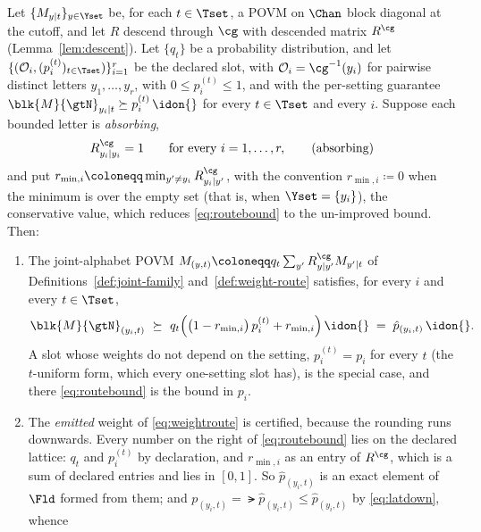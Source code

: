 \begin{proposition}\label{prop:route}
Let $\{M_{y|t}\}_{y\in\Yset}$ be, for each $t\in\Tset$, a POVM on $\Chan$ block
diagonal at the cutoff, and let $R$ descend through $\cg$ with descended matrix
$R^{\cg}$ (Lemma~\ref{lem:descent}). Let $\{q_t\}$ be a probability
distribution, and let $\{(\mathcal{O}_i,(p^{(t)}_i)_{t\in\Tset})\}_{i=1}^{r}$
be the declared slot, with $\mathcal{O}_i=\cg^{-1}(y_i)$ for pairwise distinct
letters $y_1,\dots,y_r$, with $0\le p^{(t)}_i\le1$, and with the per-setting
guarantee $\blk{M}{\gtN}_{y_i|t}\succeq p^{(t)}_i\,\idon{}$ for every
$t\in\Tset$ and every $i$. Suppose each bounded letter is \emph{absorbing},
\begin{equation}\label{eq:absorbing}
  R^{\cg}_{y_i|y_i}=1
  \qquad\text{for every }i=1,\dots,r,
  \tag{absorbing}
\end{equation}
and put $r_{\min,i}\coloneqq\min_{y'\ne y_i}R^{\cg}_{y_i|y'}$, with the
convention $r_{\min,i}\coloneqq0$ when the minimum is over the empty set (that
is, when $\Yset=\{y_i\}$), the conservative value, which reduces
\eqref{eq:routebound} to the un-improved bound. Then:
\begin{enumerate}[label=(\roman*),leftmargin=2.4em]
\item The joint-alphabet POVM
  $M_{(y,t)}\coloneqq q_t\sum_{y'}R^{\cg}_{y|y'}M_{y'|t}$ of
  Definitions~\ref{def:joint-family} and~\ref{def:weight-route} satisfies, for
  every $i$ and every $t\in\Tset$,
  \begin{equation}\label{eq:routebound}
    \blk{M}{\gtN}_{(y_i,t)}\ \succeq\
    q_t\Big(\big(1-r_{\min,i}\big)\,p^{(t)}_i+r_{\min,i}\Big)\,\idon{}
    \;=\;\hat p_{(y_i,t)}\,\idon{} .
  \end{equation}
  A slot whose weights do not depend on the setting, $p^{(t)}_i=p_i$ for
  every $t$ (the $t$-uniform form, which every one-setting slot has), is the
  special case, and there \eqref{eq:routebound} is the bound in $p_i$.
\item The \emph{emitted} weight of \eqref{eq:weightroute} is certified, because
  the rounding runs downwards. Every number on the right of
  \eqref{eq:routebound} lies on the declared lattice: $q_t$ and $p^{(t)}_i$ by
  declaration, and $r_{\min,i}$ as an entry of $R^{\cg}$, which is a sum of
  declared entries and lies in $[0,1]$. So $\hat p_{(y_i,t)}$ is an exact
  element of $\Fld$ formed from them; and
  $p_{(y_i,t)}=\lat{\hat p_{(y_i,t)}}\le\hat p_{(y_i,t)}$ by
  \eqref{eq:latdown}, whence
  \begin{equation*}

\end{equation*}
\end{enumerate}
\end{proposition}
